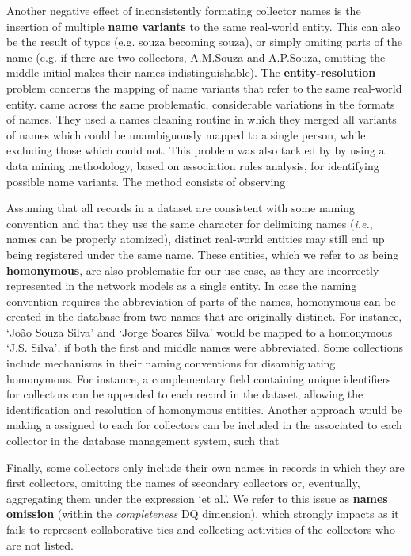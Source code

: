 Another negative effect of inconsistently formating collector names is the insertion of multiple \textbf{name variants} to the same real-world entity.
This can also be the result of typos (e.g. souza becoming souza), or simply omiting parts of the name (e.g. if there are two collectors, A.M.Souza and A.P.Souza, omitting the middle initial makes their names indistinguishable).
%
The \textbf{entity-resolution} problem concerns the mapping of name variants that refer to the same real-world entity.
 came across the same problematic, considerable variations in the formats of names.
They used a names cleaning routine in which they merged all variants of names which could be unambiguously mapped to a single person, while excluding those which could not.
This problem was also tackled by  by using a data mining methodology, based on association rules analysis, for identifying possible name variants.
The method consists of observing 

Assuming that all records in a dataset are consistent with some naming convention and that they use the same character for delimiting names (\textit{i.e.}, names can be properly atomized), distinct real-world entities may still end up being registered under the same name.
These entities, which we refer to as being \textbf{homonymous}, are also problematic for our use case, as they are incorrectly represented in the network models as a single entity.
In case the naming convention requires the abbreviation of parts of the names, homonymous can be created in the database from two names that are originally distinct.
For instance, `João Souza Silva' and `Jorge Soares Silva' would be mapped to a homonymous `J.S. Silva', if both the first and middle names were abbreviated.
%
Some collections include mechanisms in their naming conventions for disambiguating homonymous.
For instance, a complementary field containing unique identifiers for collectors can be appended to each record in the dataset, allowing the identification and resolution of homonymous entities.
Another approach would be making a
assigned to each for collectors can be included in the associated to each collector in the database management system, such that 


Finally, some collectors only include their own names in records in which they are first collectors, omitting the names of secondary collectors or, eventually, aggregating them under the expression `et al.'.
We refer to this issue as \textbf{names omission} (within the \textit{completeness} DQ dimension), which strongly impacts as it fails to represent collaborative ties and collecting activities of the collectors who are not listed.



